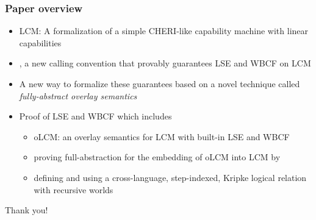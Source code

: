 \documentclass[aspectratio=169]{beamer}
\begin{document}
\begin{frame}
  \frametitle{Paper overview}
\begin{itemize}
\item LCM: A formalization of a simple CHERI-like capability machine with linear capabilities
\item \stktokens{}, a new calling convention that provably guarantees LSE and WBCF on LCM
\item A new way to formalize these guarantees based on a novel technique called \textit{fully-abstract overlay semantics}
\item Proof of LSE and WBCF which includes
  \begin{itemize}
  \item oLCM: an overlay semantics for LCM with built-in LSE and WBCF
  \item proving full-abstraction for the embedding of oLCM into LCM by
  \item defining and using a cross-language, step-indexed, Kripke logical relation with recursive worlds
  \end{itemize}
\end{itemize}
\end{frame}

\begin{frame}
  \centering
  Thank you!
\end{frame}

\end{document}
